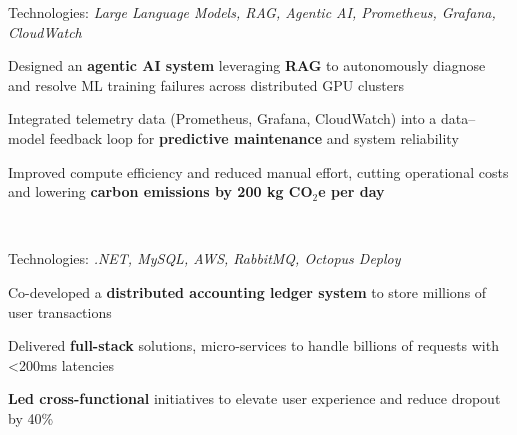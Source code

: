 

\vspace{-2mm}

\begin{cvskills}

{
\begin{cvitems}
\item[] Technologies: \emph{Large Language Models, RAG, Agentic AI, Prometheus, Grafana, CloudWatch} 
\item Designed an \textbf{\bodyfontlight agentic AI system} leveraging \textbf{\bodyfontlight RAG} to autonomously diagnose and resolve ML training failures across distributed GPU clusters
    \item Integrated telemetry data (Prometheus, Grafana, CloudWatch) into a data–model feedback loop for \textbf{\bodyfontlight predictive maintenance} and system reliability
    \item Improved compute efficiency and reduced manual effort, cutting operational costs and lowering \textbf{\bodyfontlight carbon emissions by 200 kg CO$_2$e per day}
\end{cvitems}
}

\\

{
\begin{cvitems}
\item[] Technologies: \emph{.NET, MySQL, AWS, RabbitMQ, Octopus Deploy}
\item Co-developed a \textbf{\bodyfontlight distributed accounting ledger system} to store millions of user transactions
\item Delivered \textbf{\bodyfontlight full-stack} solutions, micro-services to handle billions of requests with <200ms latencies
\item \textbf{\bodyfontlight Led cross-functional} initiatives to elevate user experience and reduce dropout by 40\%
\end{cvitems}
}

\\


\end{cvskills}
